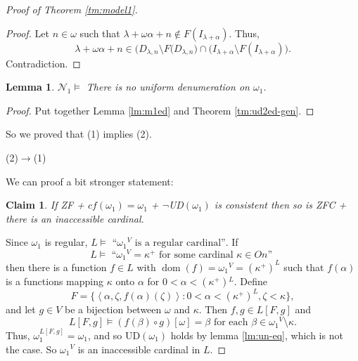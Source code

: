 \documentclass[a4paper,10pt,reqno]{amsart}
\numberwithin{equation}{section}
\newtheorem{lemma}[theorem]{Lemma}
\newtheorem{claim}{Claim}[theorem]
\theoremstyle{definition}
\theoremstyle{remark}
\newcommand{\mc}[1]{\mathcal{#1}}
\newcommand{\setm}{\setminus}
\newcommand{\subs}{\subset}
\newcommand{\dom}{\operatorname{dom}}
\def\<{\left\langle}
\def\>{\right\rangle}
\begin{document}
\begin{proof}[Proof of Theorem \ref{tm:model1}]
\begin{proof}
Let $n\in {\omega}$ such that ${\lambda}+{\omega}{\alpha}+n\notin F(I_{{\lambda}+{\alpha}})$.
Thus, 
$${\lambda}+{\omega}{\alpha}+n\in 
\big (D_{{\lambda},n}\setm F(D_{{\lambda},n}\big)
\cap \big(I_{{\lambda}+{\alpha}}\setm F(I_{{\lambda}+{\alpha}})\big).$$
Contradiction.
\end{proof}

\begin{lemma}
    $\mc N_1\models$   There is no uniform denumeration on ${\omega}_1$. 
\end{lemma}

\begin{proof}
Put together Lemma \ref{lm:m1ed} and Theorem \ref{tm:ud2ed-gen}.
%
\end{proof}



So we proved that (1) implies (2).

\noindent (2)$\to$(1)

We can proof a bit stronger statement:

\begin{claim}\label{cl :stronger}
    If ZF + $cf({\omega}_1)={\omega}_1$ + $\neg$UD$({\omega}_1)$  is consistent then so is ZFC + there is an inaccessible cardinal. 
\end{claim}


Since ${\omega}_1$ is regular, $L\models \text{ ``${{\omega}_1}^V$ is a regular cardinal''}$. 
If $$L\models \text{ ``${{\omega}_1}^V={\kappa}^+$ for some cardinal ${\kappa}\in On $'' }$$
then there is a function $f\in L$ with $\dom(f)={{\omega}_1}^V= ({\kappa}^+)^L$ 
such that $f({\alpha})$ is a functions mapping  ${\kappa}$ onto ${\alpha}$ for 
$0<{\alpha}<({\kappa}^+){}^L$.
Define  
$$F=\{\<{\alpha},{\zeta}, f({\alpha})({\zeta})\>:0<{\alpha}<({\kappa}^+)^L,{\zeta}<{\kappa}\},$$
and let $g\in V$ be a bijection between ${\omega}$ and ${\kappa}$.
Then $f,g\in  L[F,g]$ and 
\begin{displaymath}
L[F,g]\models (f({\beta})\circ g)[{\omega}]={\beta}\text{ for each }  {\beta}\in {{\omega}_1}^V\setm {\kappa}.
\end{displaymath}
Thus, ${\omega}_1^{L[F,g]}={\omega}_1$, and so UD$({\omega}_1)$ holds by lemma \ref{lm:un-eq},
which is not the case. 
So ${{\omega}_1}^V$ is an inaccessible cardinal in $L$.
\end{proof}
\end{document}
